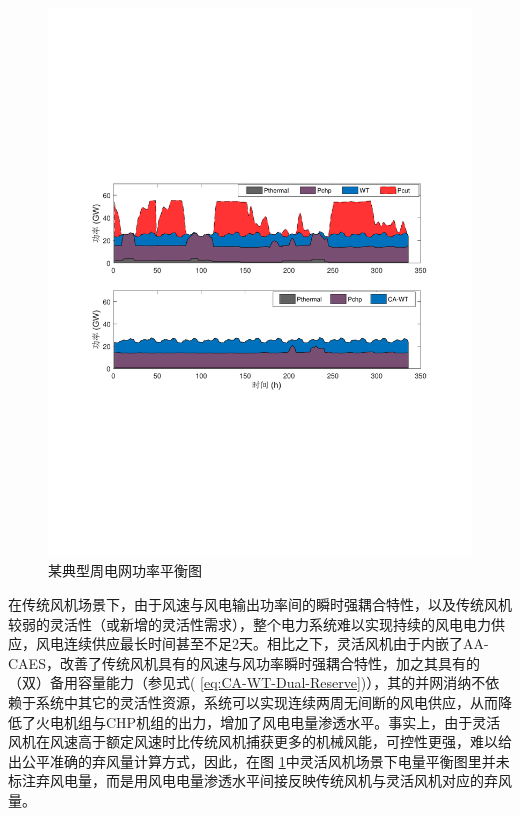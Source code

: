 \begin{figure}[!htp] %
  \centering
  \includegraphics[scale=0.75]{figures/Chap5-14-MengXi-PowerBalance.pdf}
  \caption{某典型周电网功率平衡图}
  \label{fig:MengXi-PowerBalance}
\end{figure}

在传统风机场景下，由于风速与风电输出功率间的瞬时强耦合特性，以及传统风机较弱的灵活性（或新增的灵活性需求），整个电力系统难以实现持续的风电电力供应，风电连续供应最长时间甚至不足2天。相比之下，灵活风机由于内嵌了AA-CAES，改善了传统风机具有的风速与风功率瞬时强耦合特性，加之其具有的（双）备用容量能力（参见式(
\ref{eq:CA-WT-Dual-Reserve})），其的并网消纳不依赖于系统中其它的灵活性资源，系统可以实现连续两周无间断的风电供应，从而降低了火电机组与CHP机组的出力，增加了风电电量渗透水平。事实上，由于灵活风机在风速高于额定风速时比传统风机捕获更多的机械风能，可控性更强，难以给出公平准确的弃风量计算方式，因此，在图
\ref{fig:MengXi-PowerBalance}中灵活风机场景下电量平衡图里并未标注弃风电量，而是用风电电量渗透水平间接反映传统风机与灵活风机对应的弃风量。

